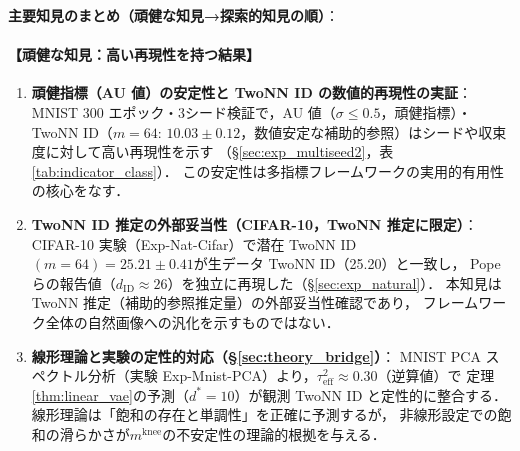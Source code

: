 \documentclass[11pt,a4paper]{jsarticle}
\newcommand{\mknee}{m^{\mathrm{knee}}}
\begin{document}
\textbf{主要知見のまとめ（頑健な知見→探索的知見の順）}：

\paragraph{【頑健な知見：高い再現性を持つ結果】}
\begin{enumerate}
  \item \textbf{頑健指標（AU 値）の安定性と TwoNN ID の数値的再現性の実証}：
        MNIST 300 エポック・3シード検証で，AU 値（$\sigma \leq 0.5$，頑健指標）・
        TwoNN ID（$m=64$: $10.03 \pm 0.12$，数値安定な補助的参照）はシードや収束度に対して高い再現性を示す
        （§\ref{sec:exp_multiseed2}，表\ref{tab:indicator_class}）．
        この安定性は多指標フレームワークの実用的有用性の核心をなす．
  \item \textbf{TwoNN ID 推定の外部妥当性（CIFAR-10，TwoNN 推定に限定）}：
        CIFAR-10 実験（Exp-Nat-Cifar）で潜在 TwoNN ID$(m=64)=25.21\pm0.41$が生データ TwoNN ID（25.20）と一致し，
        Pope ら\cite{pope2021intrinsic}の報告値（$d_\mathrm{ID} \approx 26$）を独立に再現した（§\ref{sec:exp_natural}）．
        本知見は TwoNN 推定（補助的参照推定量）の外部妥当性確認であり，
        フレームワーク全体の自然画像への汎化を示すものではない．
  \item \textbf{線形理論と実験の定性的対応（§\ref{sec:theory_bridge}）}：
        MNIST PCA スペクトル分析（実験 Exp-Mnist-PCA）より，$\tau^2_\mathrm{eff} \approx 0.30$（逆算値）で
        定理\ref{thm:linear_vae}の予測（$d^*=10$）が観測 TwoNN ID と定性的に整合する．
        線形理論は「飽和の存在と単調性」を正確に予測するが，
        非線形設定での飽和の滑らかさが$\mknee$の不安定性の理論的根拠を与える．
\end{enumerate}
\end{document}
